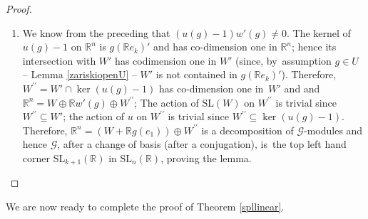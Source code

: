 \documentclass[JEP,XML,SOM,Unicode,published]{cedram}
\newenvironment{smallpmatrix}{\big(\begin{smallmatrix}}{\end{smallmatrix}\big)}
\theoremstyle{definition}
\newcommand{\field}[1]{\mathbb{#1}}
\newcommand{\R}{\field{R}}
\newcommand{\SL}{\mathrm{SL}}
\newcommand{\frg}{\mathfrak g}
\begin{document}
\begin{proof}
\begin{enumerate}
Similarly, if the map $C: \frg \to (\R ^k)^*$ is identically zero, then
\[
\frg \subseteq\{ X\in \mathfrak{sl}_{k+1}: X=\begin{smallpmatrix} A & B \\ 0 & d \end{smallpmatrix}\}
\]
leaves $\R ^k$ stable, contradicting the irreducibility of $\frg$ on $\R ^{k+1}$. Therefore, $\frg \supseteq (\R ^k)^*$. The bracket of $\R ^k$ and $(\R ^k)^*$ maps onto the trivial representation and hence $\frg \supseteq \mathrm{triv}$ as well.

By assumption, $\frg \supseteq \mathfrak{sl}_k$. Hence $\frg=\mathfrak{sl}_{k+1}$. Therefore, the image of the group $\mathcal G$
in $\mathrm{Aut} (W+\R g(e_1))$ is $\SL_{k+1}(\R) \subseteq \SL_n(\R)$ after a conjugation.

\smallskip
\item
We know from the preceding that $(u(g)-1)w'(g)\neq 0$. The kernel of $u(g)-1$ on $\R^n$ is $g(\R e_k)'$ and has co-dimension one in $\R ^n$; hence its intersection with $W'$ has codimension one in $W'$ (since, by~assumption $g\in U$ -- \cf Lemma \ref{zariskiopenU} -- $W'$ is not contained in $g(\R e_k)'$). Therefore, $W^{\prime \prime}=W'\cap\ker (u(g)-1)$ has co-dimension one in~$W'$ and and $\R^n= W\oplus \R w'(g) \oplus W^{\prime \prime}$; The action of $\SL(W)$ on $W^{\prime \prime}$ is trivial since $W^{\prime \prime}\subseteq W'$; the action of $u$ on $W^{\prime \prime}$ is trivial since $W^{\prime \prime} \subseteq\ker(u(g)-1)$. Therefore, $\R ^n=(W+\R g(e_1))\oplus W ^{\prime \prime}$ is a decomposition of $\mathcal G$-modules and hence $\mathcal G$, after a change of basis (\ie after a conjugation), is~the top left hand corner $\SL_{k+1}(\R)$ in $\SL_n(\R)$, proving the lemma.\qedhere
\end{enumerate}
\end{proof}

We are now ready to complete the proof of Theorem \ref{spllinear}.
\end{document}
